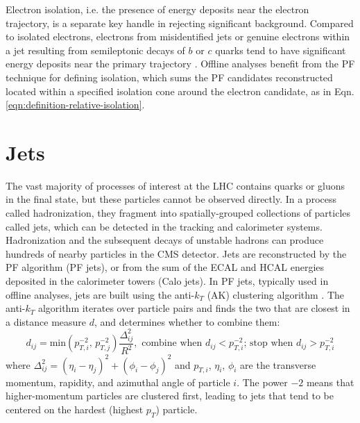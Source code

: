 Electron isolation, i.e. the presence of energy deposits near the electron trajectory, is a separate key handle in rejecting significant background. Compared to isolated electrons, electrons from misidentified jets or genuine electrons within a jet resulting from semileptonic decays of $b$ or $c$ quarks tend to have significant energy deposits near the primary trajectory \citep{JINST-2015-10-P06005}. Offline analyses benefit from the PF technique for defining isolation, which sums the PF candidates reconstructed located within a specified isolation cone around the electron candidate, as in Eqn. \ref{eqn:definition-relative-isolation}.

\section{Jets}
The vast majority of processes of interest at the LHC contains quarks or gluons in the final state, but these particles cannot be observed directly. In a process called hadronization, they fragment into spatially-grouped collections of particles called jets, which can be detected in the tracking and calorimeter systems. Hadronization and the subsequent decays of unstable hadrons can produce hundreds of nearby particles in the CMS detector. Jets are reconstructed by the PF algorithm (PF jets), or from the sum of the ECAL and HCAL energies deposited in the calorimeter towers (Calo jets). In PF jets, typically used in offline analyses, jets are built using the anti-$k_T$ (AK) clustering algorithm \cite{CMS-BTV-12-001}. The anti-$k_T$ algorithm iterates over particle pairs and finds the two that are closest in a distance measure $d$, and determines whether to combine them:
\begin{equation}
    d_{ij} = \text{min} \left(p_{T, i}^{-2}, \, p_{T, j}^{-2} \right) \frac{\Delta_{ij}^2}{R^2}, \, \,
    \text{combine when $d_{ij} < p_{T,i}^{-2}$; stop when $d_{ij} > p_{T, i}^{-2}$}
    \label{eqn:anti-kT}
\end{equation}
where $\Delta_{ij}^2 = (\eta_i - \eta_j)^2 + (\phi_i - \phi_j)^2$ and $p_{T, i}$, $\eta_i$, $\phi_i$ are the transverse momentum, rapidity, and azimuthal angle of particle $i$. The power $-2$ means that higher-momentum particles are clustered first, leading to jets that tend to be centered on the hardest (highest $p_T$) particle.

